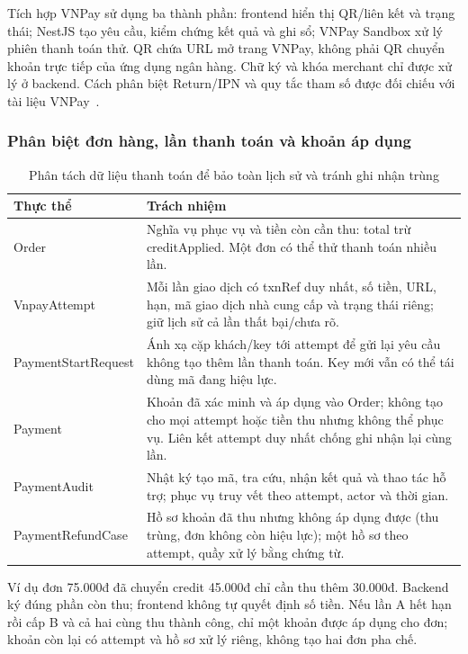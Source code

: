 \label{sec:vnpay-design}
Tích hợp VNPay sử dụng ba thành phần: frontend hiển thị QR/liên kết và trạng thái; NestJS tạo yêu cầu, kiểm chứng kết quả và ghi sổ; VNPay Sandbox xử lý phiên thanh toán thử. QR chứa URL mở trang VNPay, không phải QR chuyển khoản trực tiếp của ứng dụng ngân hàng. Chữ ký và khóa merchant chỉ được xử lý ở backend. Cách phân biệt Return/IPN và quy tắc tham số được đối chiếu với tài liệu VNPay~\cite{VNPAYPAY,VNPAYFAQ}.

\subsubsection{Phân biệt đơn hàng, lần thanh toán và khoản áp dụng}
\begin{table}[htbp]\centering\small
\begin{tabularx}{\linewidth}{|p{.30\linewidth}|X|}\hline
\textbf{Thực thể} & \textbf{Trách nhiệm}\\\hline
Order & Nghĩa vụ phục vụ và tiền còn cần thu: total trừ creditApplied. Một đơn có thể thử thanh toán nhiều lần.\\\hline
VnpayAttempt & Mỗi lần giao dịch có txnRef duy nhất, số tiền, URL, hạn, mã giao dịch nhà cung cấp và trạng thái riêng; giữ lịch sử cả lần thất bại/chưa rõ.\\\hline
PaymentStartRequest & Ánh xạ cặp khách/key tới attempt để gửi lại yêu cầu không tạo thêm lần thanh toán. Key mới vẫn có thể tái dùng mã đang hiệu lực.\\\hline
Payment & Khoản đã xác minh và áp dụng vào Order; không tạo cho mọi attempt hoặc tiền thu nhưng không thể phục vụ. Liên kết attempt duy nhất chống ghi nhận lại cùng lần.\\\hline
PaymentAudit & Nhật ký tạo mã, tra cứu, nhận kết quả và thao tác hỗ trợ; phục vụ truy vết theo attempt, actor và thời gian.\\\hline
PaymentRefundCase & Hồ sơ khoản đã thu nhưng không áp dụng được (thu trùng, đơn không còn hiệu lực); một hồ sơ theo attempt, quầy xử lý bằng chứng từ.\\\hline
\end{tabularx}\caption{Phân tách dữ liệu thanh toán để bảo toàn lịch sử và tránh ghi nhận trùng}
\end{table}

Ví dụ đơn 75.000đ đã chuyển credit 45.000đ chỉ cần thu thêm 30.000đ. Backend ký đúng phần còn thu; frontend không tự quyết định số tiền. Nếu lần A hết hạn rồi cấp B và cả hai cùng thu thành công, chỉ một khoản được áp dụng cho đơn; khoản còn lại có attempt và hồ sơ xử lý riêng, không tạo hai đơn pha chế.

